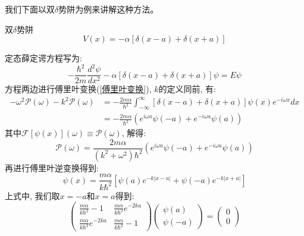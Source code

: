 \documentclass[a4paper,zihao=-4,linespread=1]{ctexrep}
\begin{document}
    我们下面以双$\delta$势阱为例来讲解这种方法。
    \begin{define}{双$\delta$势阱}
        \begin{equation}
            V(x)=-\alpha\left[\delta(x-a)+\delta(x+a)\right]
        \end{equation}
    \end{define}
    定态薛定谔方程写为:
    \begin{equation}
        -\frac{\hbar^2}{2m}\frac{d^2\psi}{dx^2}-\alpha\left[\delta(x-a)+\delta(x+a)\right]\psi=E\psi
    \end{equation}
    方程两边进行傅里叶变换(\ref{傅里叶变换}), $k$的定义同前, 有:
    \begin{equation}
        \begin{aligned}
        -\omega^2\mathscr{P}(\omega)-k^2\mathscr{P}(\omega)&=-\frac{2m\alpha}{\hbar^2}\int_{-\infty}^{\infty}\left[\delta(x-a)+\delta(x+a)\right]\psi(x)e^{-i\omega x}dx\\
        &=-\frac{2m\alpha}{\hbar^2}\left(e^{i\omega a}\psi(-a)+e^{-i\omega a}\psi(a)\right)
        \end{aligned}
    \end{equation}
    其中$\mathscr{F}\left[\psi(x)\right](\omega)\equiv\mathscr{P}(\omega)$, 解得:
    \begin{equation}
        \mathscr{P}(\omega)=\frac{2m\alpha}{\left(k^2+\omega^2\right)\hbar^2}\left(e^{i\omega a}\psi(-a)+e^{-i\omega a}\psi(a)\right)
    \end{equation}
    再进行傅里叶逆变换得到:
    \begin{equation}
        \psi(x)= \frac{m\alpha}{k\hbar^2}\left[\psi(a)e^{-k|x-a|}+\psi(-a)e^{-k|x+a|}\right]
    \end{equation}
    上式中, 我们取$x=-a$和$x=a$得到:
    \begin{equation}
        \begin{pmatrix}
            \frac{m\alpha}{k\hbar^2}-1&\frac{m\alpha}{k\hbar^2}e^{-2ka}\\
            \frac{m\alpha}{k\hbar^2}e^{-2ka}&\frac{m\alpha}{k\hbar^2}-1
        \end{pmatrix}
        \begin{pmatrix}
            \psi(a)\\
            \psi(-a)
        \end{pmatrix}
        =\begin{pmatrix}
            0\\0
        \end{pmatrix}
    \end{equation}
\end{document}
